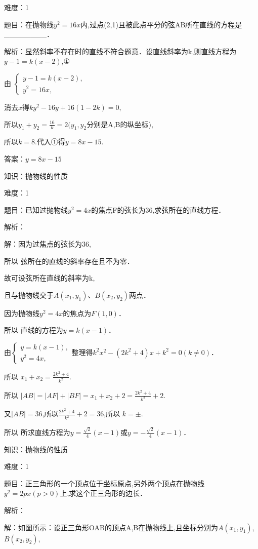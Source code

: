 \documentclass{article} %
\begin{document}
难度：1

题目：在抛物线$y^{2}=16x$内,过点(2,1)且被此点平分的弦AB所在直线的方程是\_\_\_\_\_\_\_\_．

解析：显然斜率不存在时的直线不符合题意．设直线斜率为k,则直线方程为$y-1=k(x-2)$,①

由
$
\begin{cases}
y-1=k(x-2),\\
y^2=16x,
\end{cases}$

消去$x$得$ky^{2}-16y+16(1-2k)=0$,

所以$y_{1}+y_{2}=\frac{16}{k}=2(y_{1},y_{2}$分别是A,B的纵坐标),

所以$k=8$.代入①得$y=8x-15$.

答案：$y=8x-15$



知识：抛物线的性质

难度：1

题目：已知过抛物线$y^{2}=4x$的焦点F的弦长为36,求弦所在的直线方程．

解析：

解：因为过焦点的弦长为36,

所以 弦所在的直线的斜率存在且不为零．

故可设弦所在直线的斜率为k,

且与抛物线交于$A(x_{1},y_{1})$、$B(x_{2},y_{2})$两点．

因为抛物线$y^{2}=4x$的焦点为$F(1,0)$．

所以 直线的方程为$y=k(x-1)$．

由$
\begin{cases}
y=k(x-1),\\
y^2=4x,
\end{cases}$整理得$k^{2}x^{2}-(2k^{2}+4)x+k^{2}=0(k\neq0)$．

所以 $x_{1}+x_{2}=\frac{2k^2+4}{k^2}$.

所以 $|AB|=|AF|+|BF|=x_{1}+x_{2}+2=\frac{2k^2+4}{k^2}+2$.

又$|AB|=36$,所以$\frac{2k^2+4}{k^2} +2=36$,所以 $k=\pm$.

所以 所求直线方程为$y=\frac{\sqrt{2}}{4}(x-1)$或$y=-\frac{\sqrt{2}}{4}(x-1)$．



知识：抛物线的性质

难度：1

题目：正三角形的一个顶点位于坐标原点,另外两个顶点在抛物线$y^{2}=2px(p>0)$上,求这个正三角形的边长．

解析：

解：如图所示：设正三角形OAB的顶点A,B在抛物线上,且坐标分别为$A(x_{1},y_{1})$,$B(x_{2},y_{2})$,
\end{document}

